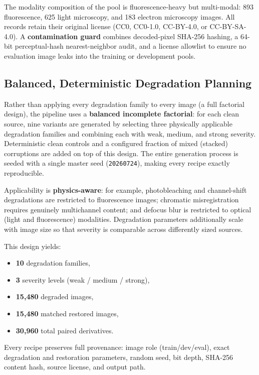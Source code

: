 \documentclass[11pt]{article}
\begin{document}
The modality composition of the pool is fluorescence-heavy but multi-modal: 893
fluorescence, 625 light microscopy, and 183 electron microscopy images. All records
retain their original license (CC0, CC0-1.0, CC-BY-4.0, or CC-BY-SA-4.0). A
\textbf{contamination guard} combines decoded-pixel SHA-256 hashing, a 64-bit
perceptual-hash nearest-neighbor audit, and a license allowlist to ensure no evaluation
image leaks into the training or development pools.

\subsection{Balanced, Deterministic Degradation Planning}

Rather than applying every degradation family to every image (a full factorial design),
the pipeline uses a \textbf{balanced incomplete factorial}: for each clean source, nine
variants are generated by selecting three physically applicable degradation families and
combining each with weak, medium, and strong severity. Deterministic clean controls and
a configured fraction of mixed (stacked) corruptions are added on top of this design.
The entire generation process is seeded with a single master seed
(\texttt{20260724}), making every recipe exactly reproducible.

Applicability is \textbf{physics-aware}: for example, photobleaching and channel-shift
degradations are restricted to fluorescence images; chromatic misregistration requires
genuinely multichannel content; and defocus blur is restricted to optical (light and
fluorescence) modalities. Degradation parameters additionally scale with image size so
that severity is comparable across differently sized sources.

This design yields:
\begin{itemize}[leftmargin=1.4em]
    \item \textbf{10} degradation families,
    \item \textbf{3} severity levels (weak / medium / strong),
    \item \textbf{15{,}480} degraded images,
    \item \textbf{15{,}480} matched restored images,
    \item \textbf{30{,}960} total paired derivatives.
\end{itemize}

Every recipe preserves full provenance: image role (train/dev/eval), exact
degradation and restoration parameters, random seed, bit depth, SHA-256 content hash,
source license, and output path.
\end{document}
